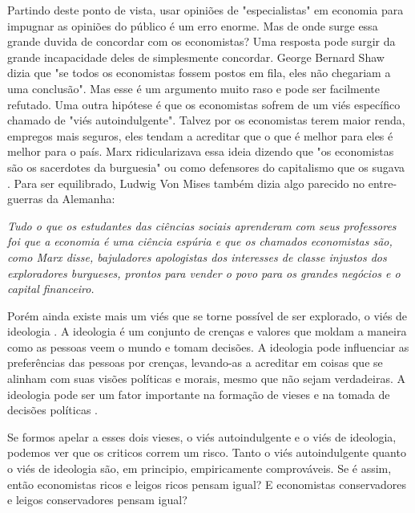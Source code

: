 Partindo deste ponto de vista, usar opiniões de "especialistas" em economia para impugnar as opiniões do público é um erro enorme. Mas de onde surge essa grande duvida de concordar com os economistas? Uma resposta pode surgir da grande incapacidade deles de simplesmente concordar. George Bernard Shaw dizia que "se todos os economistas fossem postos em fila, eles não chegariam a uma conclusão". Mas esse é um argumento muito raso e pode ser facilmente refutado. Uma outra hipótese é que os economistas sofrem de um viés específico chamado de "viés autoindulgente". Talvez por os economistas terem maior renda, empregos mais seguros, eles tendam a acreditar que o que é melhor para eles é melhor para o país. Marx ridicularizava essa ideia dizendo que "os economistas são os sacerdotes da burguesia" ou como defensores do capitalismo que os sugava \cite{marx_engels_capital}. Para ser equilibrado, Ludwig Von Mises também dizia algo parecido no entre-guerras da Alemanha:

\begin{citacao}
    \textit{
        Tudo o que os estudantes das ciências sociais aprenderam com seus professores foi que a economia é uma ciência espúria e que os chamados economistas são, como Marx disse, bajuladores apologistas dos interesses de classe injustos dos exploradores burgueses, prontos para vender o povo para os grandes negócios e o capital financeiro.
    } \newline
    \cite{mises_bureaucracy}

\end{citacao}

Porém ainda existe mais um viés que se torne possível de ser explorado, o viés de ideologia \cite{The_Myth_of_the_Rational_Voter}. A ideologia é um conjunto de crenças e valores que moldam a maneira como as pessoas veem o mundo e tomam decisões. A ideologia pode influenciar as preferências das pessoas por crenças, levando-as a acreditar em coisas que se alinham com suas visões políticas e morais, mesmo que não sejam verdadeiras. A ideologia pode ser um fator importante na formação de vieses e na tomada de decisões políticas \cite{The_Myth_of_the_Rational_Voter}.

Se formos apelar a esses dois vieses, o viés autoindulgente e o viés de ideologia, podemos ver que os criticos correm um risco. Tanto o viés autoindulgente quanto o viés de ideologia são, em principio, empiricamente comprováveis. Se é assim, então economistas ricos e leigos ricos pensam igual? E economistas conservadores e leigos conservadores pensam igual? 

